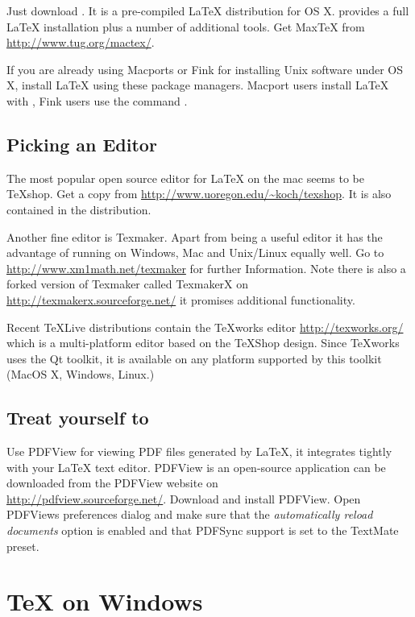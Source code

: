 Just download . It is a
pre-compiled LaTeX distribution for OS X.  provides a full LaTeX
installation plus a number of additional tools. Get MaxTeX from
\url{http://www.tug.org/mactex/}.

If you are already using Macports or Fink for installing Unix software under
OS X, install LaTeX using these package managers. Macport users install
LaTeX with ,
Fink users use the command .

\subsection{Picking an Editor}

The most popular open source editor for \LaTeX{} on the mac seems to be
\TeX{}shop.  Get a copy from \url{http://www.uoregon.edu/~koch/texshop}. It
is also contained in the  distribution.

Another fine editor is Texmaker. Apart from being a useful editor it has the
advantage of running on Windows, Mac and Unix/Linux equally well. Go to
\url{http://www.xm1math.net/texmaker} for further Information. Note there is
also a forked version of Texmaker called TexmakerX on
\url{http://texmakerx.sourceforge.net/} it promises additional functionality.

Recent \TeX Live distributions contain the \TeX{}works editor 
\url{http://texworks.org/} which is a multi-platform editor based on the \TeX{}Shop
design. Since \TeX{}works uses the Qt toolkit, it is available on any platform
supported by this toolkit (MacOS X, Windows, Linux.) 

\subsection{Treat yourself to }

Use PDFView for viewing PDF files generated by LaTeX, it integrates tightly
with your LaTeX text editor. PDFView is an open-source application can be
downloaded from the PDFView website on\\
\url{http://pdfview.sourceforge.net/}. Download and install PDFView. Open
PDFViews preferences dialog and make sure that the \emph{automatically reload
documents} option is enabled and that PDFSync support is set to the TextMate
preset.

\section{\TeX{} on Windows}

